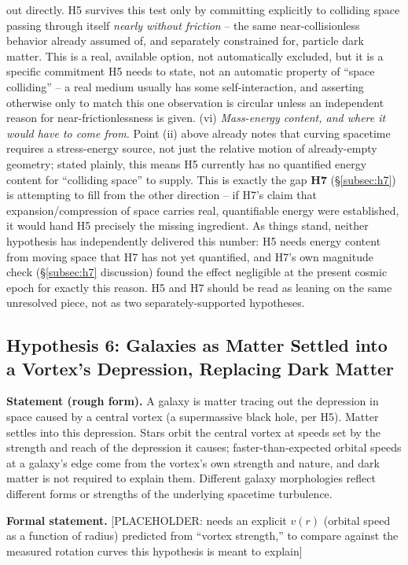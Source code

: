 \documentclass[12pt, a4paper]{article}
\begin{document}
out directly. H5 survives this test only by committing explicitly to
colliding space passing through itself \emph{nearly without
friction} -- the same near-collisionless behavior already assumed of,
and separately constrained for, particle dark matter. This is a real,
available option, not automatically excluded, but it is a specific
commitment H5 needs to state, not an automatic property of ``space
colliding'' -- a real medium usually has some self-interaction, and
asserting otherwise only to match this one observation is circular
unless an independent reason for near-frictionlessness is given.
(vi) \emph{Mass-energy content, and where it would have to come from.}
Point (ii) above already notes that curving spacetime requires a
stress-energy source, not just the relative motion of already-empty
geometry; stated plainly, this means H5 currently has no quantified
energy content for ``colliding space'' to supply. This is exactly the
gap \textbf{H7} (\S\ref{subsec:h7}) is attempting to fill from the
other direction -- if H7's claim that expansion/compression of space
carries real, quantifiable energy were established, it would hand H5
precisely the missing ingredient. As things stand, neither hypothesis
has independently delivered this number: H5 needs energy content
from moving space that H7 has not yet quantified, and H7's own
magnitude check (\S\ref{subsec:h7} discussion) found the effect
negligible at the present cosmic epoch for exactly this reason. H5 and
H7 should be read as leaning on the same unresolved piece, not as two
separately-supported hypotheses.

\subsection{Hypothesis 6: Galaxies as Matter Settled into a Vortex's Depression, Replacing Dark Matter}
\label{subsec:h6}
\textbf{Statement (rough form).} A galaxy is matter tracing out the
depression in space caused by a central vortex (a supermassive black
hole, per H5). Matter settles into this depression. Stars orbit the
central vortex at speeds set by the strength and reach of the
depression it causes; faster-than-expected orbital speeds at a
galaxy's edge come from the vortex's own strength and nature, and
dark matter is not required to explain them. Different galaxy
morphologies reflect different forms or strengths of the underlying
spacetime turbulence.

\textbf{Formal statement.}
[PLACEHOLDER: needs an explicit $v(r)$ (orbital speed as a function of
radius) predicted from ``vortex strength,'' to compare against the
measured rotation curves this hypothesis is meant to explain]
\end{document}
